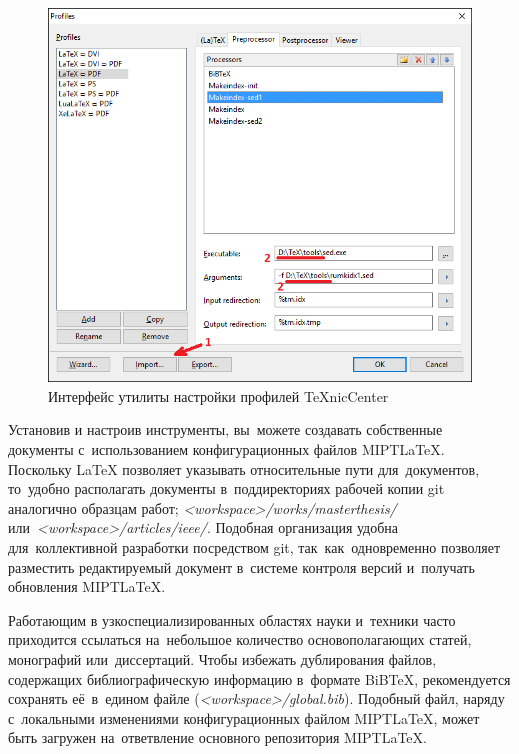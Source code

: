 \begin{figure}[h]
    \centering
    \includegraphics[scale = 0.7]{pictures/profiles.png}
    \caption{Интерфейс утилиты настройки профилей TeXnicCenter}
    \label{fig:profiles}
\end{figure}


Установив и настроив инструменты, вы~можете создавать собственные документы с~использованием конфигурационных файлов MIPT\LaTeX.
Поскольку \LaTeX{} позволяет указывать относительные пути для~документов, то~удобно располагать документы в~поддиректориях рабочей копии git аналогично образцам работ; \eg \emph{<workspace>/works/masterthesis/} или~\emph{<workspace>/articles/ieee/}.
Подобная организация удобна для~коллективной разработки посредством git, так~как~одновременно позволяет разместить редактируемый документ в~системе контроля версий и~получать обновления MIPT\LaTeX.

Работающим в узкоспециализированных областях науки и~техники часто приходится ссылаться на~небольшое количество основополагающих статей, монографий или~диссертаций.
Чтобы избежать дублирования файлов, содержащих библиографическую информацию в~формате BiBTeX, рекомендуется сохранять её~в~едином файле (\eg \emph{<workspace>/global.bib}).
Подобный файл, наряду с~локальными изменениями конфигурационных файлом MIPT\LaTeX, может быть загружен на~ответвление основного репозитория MIPT\LaTeX.

